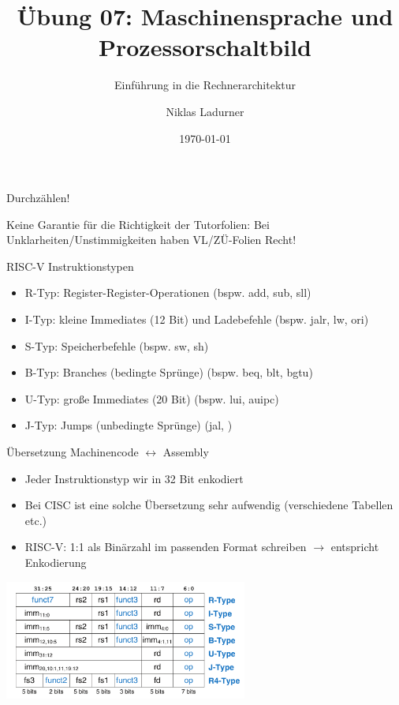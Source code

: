 \documentclass[
  german,            %
  aspectratio=169,    %
]{tumbeamer}
\title{Übung 07: Maschinensprache und \\Prozessorschaltbild}
\subtitle{Einführung in die Rechnerarchitektur}
\author{Niklas Ladurner}
\institute{\theChairName\\\theDepartmentName\\\theUniversityName}
\date[\today]{\today}
\begin{document}
\maketitle

\begin{frame}[c]{}{}
  \begin{center}
    \LARGE  Durchzählen!
  \end{center}
\end{frame}

\begin{frame}[c]{}{}
  \begin{center}
    \LARGE  Keine Garantie für die Richtigkeit der Tutorfolien: Bei Unklarheiten/Unstimmigkeiten
    haben VL/ZÜ-Folien Recht!
  \end{center}
\end{frame}

\begin{frame}[fragile, c]{RISC-V Instruktionstypen}{}
  \begin{itemize}
    \item R-Typ: Register-Register-Operationen (bspw. add, sub, sll)
    \item I-Typ: kleine Immediates (12 Bit) und Ladebefehle (bspw. jalr, lw, ori)
    \item S-Typ: Speicherbefehle (bspw. sw, sh)
    \item B-Typ: Branches (bedingte Sprünge) (bspw. beq, blt, bgtu)
    \item U-Typ: große Immediates (20 Bit) (bspw. lui, auipc)
    \item J-Typ: Jumps (unbedingte Sprünge) (jal, )
  \end{itemize}
\end{frame}

\begin{frame}[c, fragile]{Übersetzung Machinencode $\leftrightarrow$ Assembly}{}
  \begin{itemize}
    \item Jeder Instruktionstyp wir in 32 Bit enkodiert
    \item Bei CISC ist eine solche Übersetzung sehr aufwendig (verschiedene Tabellen etc.)
    \item RISC-V: 1:1 als Binärzahl im passenden Format schreiben $\rightarrow$ entspricht Enkodierung
  \end{itemize}
  \begin{center}
    \includegraphics[width=0.6\textwidth]{w07_types.png}
  \end{center}
\end{frame}
\end{document}

